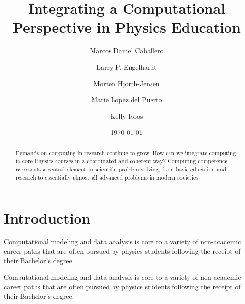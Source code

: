 \documentclass[reprint,floatfix]{revtex4-1}
\begin{document}
\title{Integrating a Computational Perspective in Physics Education}

\author{Marcos Daniel Caballero}
\author{Larry P. Engelhardt}
\author{Morten Hjorth-Jensen}
\author{Marie Lopez del Puerto}
\author{Kelly Roos}




\date{\today}




\begin{abstract}

Demands on computing in research continue to grow.  How can we
integrate computing in core Physics courses in a coordinated and
coherent way?  
Computing competence represents a central element in
scientific problem solving, from basic education and research to
essentially almost all advanced problems in modern societies.  

\end{abstract}

\maketitle

\section{Introduction}


Computational modeling and data analysis is core to a variety of
non-academic career paths that are often pursued by physics students
following the receipt of their Bachelor's degree.


Computational modeling and data analysis is core to a variety of
non-academic career paths that are often pursued by physics students
following the receipt of their Bachelor's degree.
\end{document}
